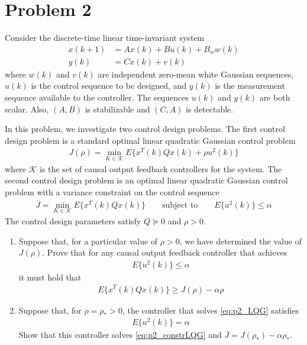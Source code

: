\section*{Problem 2}

Consider the discrete-time linear time-invariant system
\begin{align*}
    x(k+1) & = Ax(k) + Bu(k) + B_w w(k) \\
    y(k) & = Cx(k) + v(k)
\end{align*}
where $w(k)$ and $v(k)$ are independent zero-mean white Gaussian sequences, $u(k)$ is the control sequence to be designed, and $y(k)$ is the measurement sequence available to the controller. The sequences $u(k)$ and $y(k)$ are both scalar. Also, $(A,B)$ is stabilizable and $(C,A)$ is detectable.

In this problem, we investigate two control design problems. The first control design problem is a standard optimal linear quadratic Gaussian control problem
\begin{align}
    J(\rho) = \min_{K \in \mathcal{K}} E\{ x^T(k) Q x(k) + \rho u^2(k) \}
        \label{eq:p2_LQG}
\end{align}
where $\mathcal{K}$ is the set of causal output feedback controllers for the system. The second control design problem is an optimal linear quadratic Gaussian control problem with a variance constraint on the control sequence
\begin{align}
    \bar{J} = \min_{K \in \mathcal{K}} E\{ x^T(k) Qx(k)\}
        \qquad \textrm{subject to} \qquad E\{u^2(k)\} \leq \alpha
        \label{eq:p2_constrLQG}
\end{align}
The control design parameters satisfy $Q \succeq 0$ and $\rho > 0$.

\begin{enumerate}
    \item
    Suppose that, for a particular value of $\rho > 0$, we have determined the value of $J(\rho)$. Prove that for any causal output feedback controller that achieves
    \begin{align*}
        E\{ u^2(k) \} \leq \alpha
    \end{align*}
    it must hold that
    \begin{align*}
        E\{ x^T(k) Qx(k) \} \geq  J(\rho) - \alpha \rho
    \end{align*}


    \item
    Suppose that, for $\rho = \rho_* > 0$, the controller that solves \eqref{eq:p2_LQG} satisfies
    \begin{align*}
        E \{ u^2(k) \} = \alpha
    \end{align*}
    Show that this controller solves \eqref{eq:p2_constrLQG} and $\bar{J} = J(\rho_*) - \alpha \rho_*$.



\end{enumerate}


